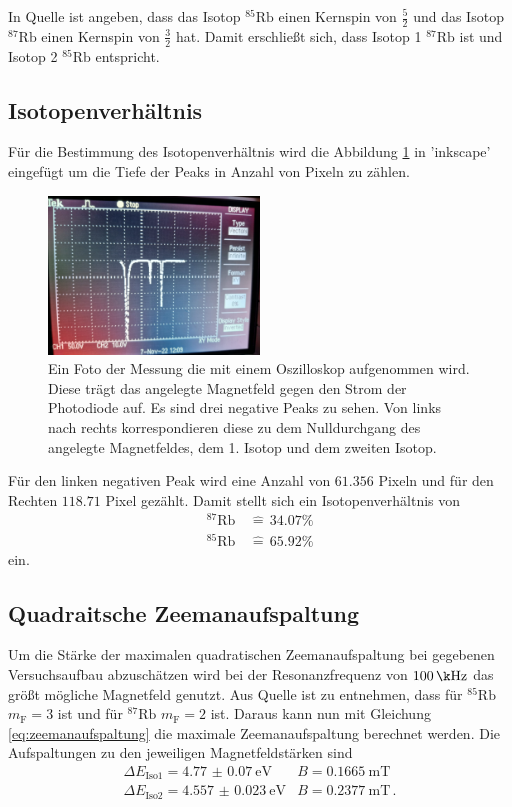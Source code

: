 In Quelle \cite{pdf_anleitung} ist angeben, dass das Isotop {$^{85}\text{Rb}$ einen Kernspin von $\frac{5}{2}$} und das Isotop $^{87}\text{Rb}$ einen Kernspin von $\frac{3}{2}$ hat.
Damit erschließt sich, dass Isotop 1  $^{87}\text{Rb}$ ist und Isotop 2 $^{85}\text{Rb}$ entspricht.

\subsection{Isotopenverhältnis}
Für die Bestimmung des Isotopenverhältnis wird die Abbildung \ref{fig:isotop} in 'inkscape' \cite{Inkscape} eingefügt um die Tiefe der Peaks in Anzahl von Pixeln zu zählen.

\begin{figure}
    \centering
    \includegraphics[width=0.5\textwidth]{Data/isotope.jpeg}
    \caption{Ein Foto der Messung die mit einem Oszilloskop aufgenommen wird.
    Diese trägt das angelegte Magnetfeld gegen den Strom der Photodiode auf.
    Es sind drei negative Peaks zu sehen.
    Von links nach rechts korrespondieren diese zu dem Nulldurchgang des angelegte Magnetfeldes, dem 1. Isotop und dem zweiten Isotop.}
    \label{fig:isotop}
\end{figure}
Für den linken negativen Peak wird eine Anzahl von $61.356$ Pixeln und für den Rechten $118.71$ Pixel gezählt.
Damit stellt sich ein Isotopenverhältnis von 
\begin{align*}
    ^{87}\text{Rb} \, &\widehat{=}\, 34.07\% \\
    ^{85}\text{Rb} \, &\widehat{=}\, 65.92\%
\end{align*}
ein.

\subsection{Quadraitsche Zeemanaufspaltung}
Um die Stärke der maximalen quadratischen Zeemanaufspaltung bei gegebenen Versuchsaufbau abzuschätzen wird bei der Resonanzfrequenz von $\SI{100}{\k\Hz}$ das größt mögliche Magnetfeld genutzt.
Aus Quelle \cite{pdf_anleitung} ist zu entnehmen, dass für $^{85}\text{Rb}$ $m_\text{F} = 3$ ist und für $^{87}\text{Rb}$ $m_\text{F} = 2$ ist.
Daraus kann nun mit Gleichung \eqref{eq:zeemanaufspaltung} die maximale Zeemanaufspaltung berechnet werden.
Die Aufspaltungen zu den jeweiligen Magnetfeldstärken sind
\begin{align*}
    \Delta E_\text{Iso1} = \SI{4.77(7)}{\eV} & B=\SI{0.1665}{\m\tesla} \\
    \Delta E_\text{Iso2} = \SI{4.557(23)}{\eV} & B=\SI{0.2377}{\m\tesla}  \, .
\end{align*}


